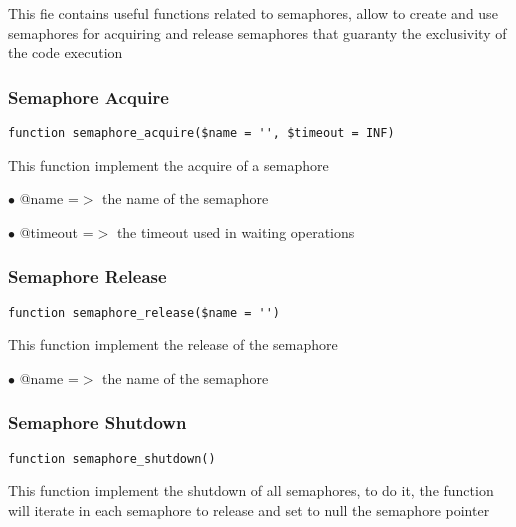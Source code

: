 \documentclass[a4paper]{article}
\begin{document}
This fie contains useful functions related to semaphores, allow to create and use semaphores
for acquiring and release semaphores that guaranty the exclusivity of the code execution

\hypertarget{toc203}{}
\subsubsection{Semaphore Acquire}

\begin{lstlisting}
function semaphore_acquire($name = '', $timeout = INF)
\end{lstlisting}

This function implement the acquire of a semaphore

\begin{compactitem}
\item[\color{myblue}$\bullet$] @name    =$>$ the name of the semaphore
\item[\color{myblue}$\bullet$] @timeout =$>$ the timeout used in waiting operations
\end{compactitem}

\hypertarget{toc204}{}
\subsubsection{Semaphore Release}

\begin{lstlisting}
function semaphore_release($name = '')
\end{lstlisting}

This function implement the release of the semaphore

\begin{compactitem}
\item[\color{myblue}$\bullet$] @name =$>$ the name of the semaphore
\end{compactitem}

\hypertarget{toc205}{}
\subsubsection{Semaphore Shutdown}

\begin{lstlisting}
function semaphore_shutdown()
\end{lstlisting}

This function implement the shutdown of all semaphores, to do it,
the function will iterate in each semaphore to release and set to
null the semaphore pointer
\end{document}
